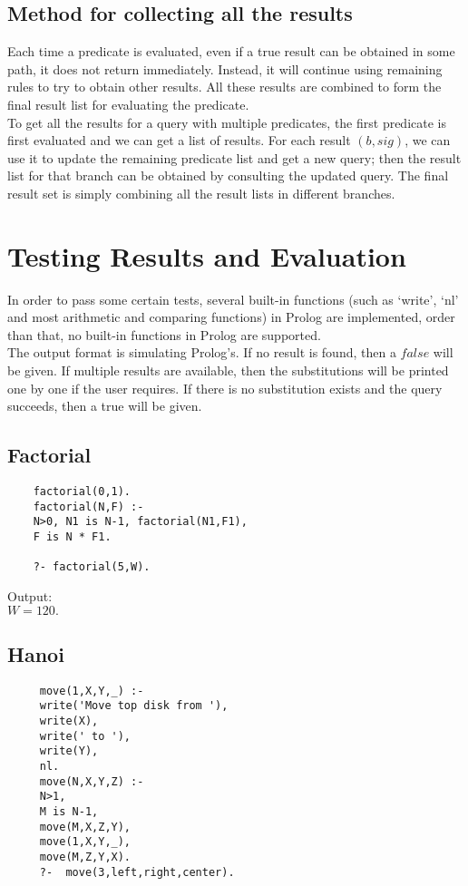 \documentclass[11pt,a4paper]{report}
\begin{document}
\subsection*{Method for collecting all the results}
Each time a predicate is evaluated, even if a true result can be obtained in some path, it does not return immediately. Instead, it will continue using remaining rules to try to obtain other results. All these results are combined to form the final result list for evaluating the predicate.\\
To get all the results for a query with multiple predicates, the first predicate is first evaluated and we can get a list of results. For each result $(b,sig)$, we can use it to update the remaining predicate list and get a new query; then the result list for that branch can be obtained by consulting the updated query. The final result set is simply combining all the result lists in different branches. 


\section*{Testing Results and Evaluation}
In order to pass some certain tests, several built-in functions (such as `write', `nl' and most arithmetic and comparing functions) in Prolog are implemented, order than that, no built-in functions in Prolog are supported.\\

The output format is simulating Prolog's. If no result is found, then a $false$ will be given.
If multiple results are available, then the substitutions will be printed one by one if the user requires. If there is no substitution exists and the query succeeds, then a true will be given.

\subsection*{Factorial}
\begin{lstlisting}
	factorial(0,1). 
	factorial(N,F) :- 
	N>0, N1 is N-1, factorial(N1,F1),
	F is N * F1. 
	
	?- factorial(5,W).
\end{lstlisting}
Output:\\
$W=120.$


\subsection*{Hanoi}
\begin{lstlisting}
	 move(1,X,Y,_) :-  
	 write('Move top disk from '), 
	 write(X), 
	 write(' to '), 
	 write(Y), 
	 nl. 
	 move(N,X,Y,Z) :- 
	 N>1, 
	 M is N-1, 
	 move(M,X,Z,Y), 
	 move(1,X,Y,_), 
	 move(M,Z,Y,X).  
	 ?-  move(3,left,right,center). 
\end{lstlisting}
\end{document}
